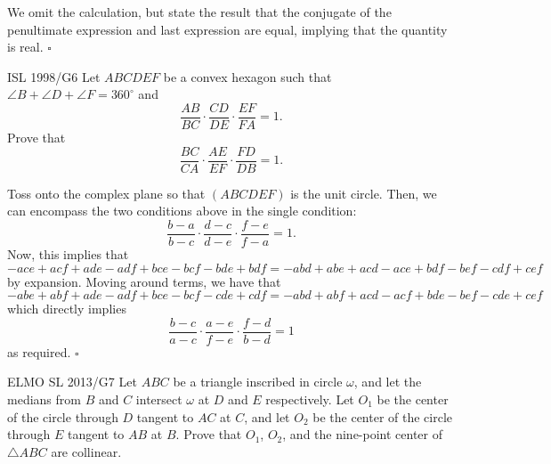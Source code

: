 \documentclass{article}
\begin{document}
We omit the calculation, but state the result that the conjugate of the penultimate expression and last expression are equal, implying that the quantity is real. $\square$

\begin{problem}[6.45]{ISL 1998/G6}
Let $ABCDEF$ be a convex hexagon such that $\angle B+\angle D+\angle F=360^\circ$ and \[\frac{AB}{BC} \cdot \frac{CD}{DE} \cdot \frac{EF}{FA} = 1.\] Prove that \[\frac{BC}{CA} \cdot \frac{AE}{EF} \cdot \frac{FD}{DB} = 1.\]
\end{problem}

Toss onto the complex plane so that $(ABCDEF)$ is the unit circle. Then, we can encompass the two conditions above in the single condition: \[\dfrac{b-a}{b-c}\cdot\dfrac{d-c}{d-e}\cdot\dfrac{f-e}{f-a} = 1.\] Now, this implies that \[-ace+acf+ade-adf+bce-bcf-bde+bdf = -abd+abe+acd-ace+bdf-bef-cdf+cef\] by expansion. Moving around terms, we have that \[-abe+abf+ade-adf+bce-bcf-cde+cdf = -abd+abf+acd-acf+bde-bef-cde+cef\] which directly implies \[\dfrac{b-c}{a-c}\cdot\dfrac{a-e}{f-e}\cdot\dfrac{f-d}{b-d} = 1\] as required. $\square$

\begin{problem}[6.46]{ELMO SL 2013/G7}
Let $ABC$ be a triangle inscribed in circle $\omega$, and let the medians from $B$ and $C$ intersect $\omega$ at $D$ and $E$ respectively. Let $O_1$ be the center of the circle through $D$ tangent to $AC$ at $C$, and let $O_2$ be the center of the circle through $E$ tangent to $AB$ at $B$. Prove that $O_1$, $O_2$, and the nine-point center of $\triangle ABC$ are collinear.
\end{problem}
\end{document}
